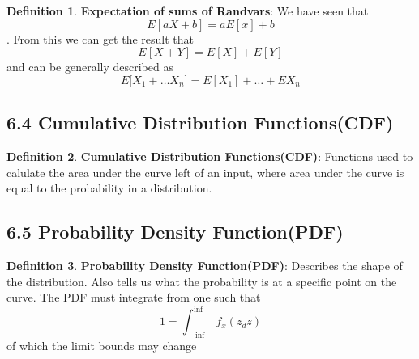 \documentclass[12pt]{amsart}
\theoremstyle{definition}
\newtheorem{definition}{Definition} %
\numberwithin{equation}{theorem}    %
\begin{document}
\begin{definition}
    \textbf{Expectation of sums of Randvars}:
    We have seen that $$E[aX+b] = aE[x]+b$$. From this we can get the result that $$E[X+Y] = E[X] + E[Y]$$ and can be generally described as $$E[{X_1+\ldots X_n] = E[X_1] +\ldots+E{X_n}}$$
\end{definition}


\subsection*{6.4 Cumulative Distribution Functions(CDF)}

\begin{definition}
    \textbf{Cumulative Distribution Functions(CDF)}:
    Functions used to calulate the area under the curve left of an input, where area under the curve is equal to the probability in a distribution.

\end{definition}


\subsection*{6.5 Probability Density Function(PDF)}

\begin{definition}
    \textbf{Probability Density Function(PDF)}: Describes the shape of the distribution. Also tells us what the probability is at a specific point on the curve. The PDF must integrate from one such that $$1 = \int_{-\inf}^{\inf}f_x(z_dz)$$ of which the limit bounds may change
\end{definition}
\end{document}
